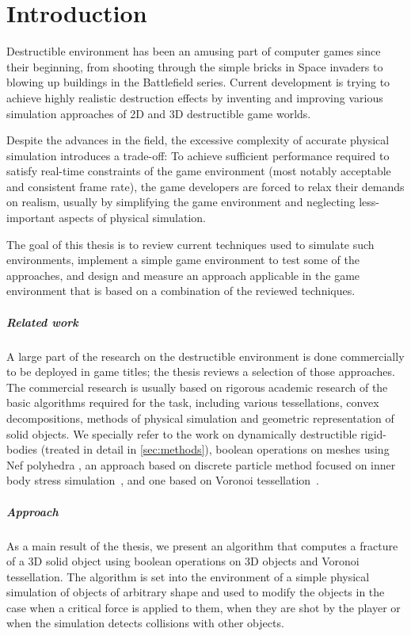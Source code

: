 \chapter*{Introduction}
Destructible environment has been an amusing part of computer games since their beginning, from shooting through the simple bricks in Space invaders to blowing up buildings in the Battlefield series. Current development is trying to achieve highly realistic destruction effects by inventing and improving various simulation approaches of 2D and 3D destructible game worlds.

Despite the advances in the field, the excessive complexity of accurate physical simulation introduces a trade-off: To achieve sufficient performance required to satisfy real-time constraints of the game environment (most notably acceptable and consistent frame rate), the game developers are forced to relax their demands on realism, usually by simplifying the game environment and neglecting less-important aspects of physical simulation.

The goal of this thesis is to review current techniques used to simulate such environments, implement a simple game environment to test some of the approaches, and design and measure an approach applicable in the game environment that is based on a combination of the reviewed techniques.

\paragraph{Related work}
A large part of the research on the destructible environment is done commercially to be deployed in game titles; the thesis reviews a selection of those approaches. The commercial research is usually based on rigorous academic research of the basic algorithms required for the task, including various tessellations, convex decompositions, methods of physical simulation and geometric representation of solid objects. We specially refer to the work on dynamically destructible rigid-bodies (treated in detail in \cref{sec:methods}), boolean operations on meshes using Nef polyhedra \citet{nefpoly}, an approach based on discrete particle method focused on inner body stress simulation~\cite{edem}, and one based on Voronoi tessellation~\cite{nvidia}.

\paragraph{Approach}
As a main result of the thesis, we present an algorithm that computes a fracture of a 3D solid object using boolean operations on 3D objects and Voronoi tessellation. The algorithm is set into the environment of a simple physical simulation of objects of arbitrary shape and used to modify the objects in the case when a critical force is applied to them, \ie when they are shot by the player or when the simulation detects collisions with other objects.

